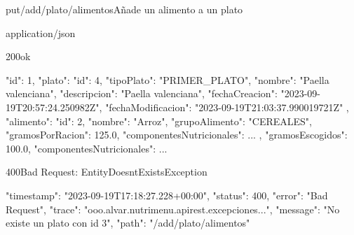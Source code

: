 \begin{apiRoute}{put}{/add/plato/alimentos}{Añade un alimento a un plato}
	\begin{routeParameter}
	\end{routeParameter}
	
	\begin{routeResponse}{application/json}
		\begin{routeResponseItem}{200}{ok}
			\begin{routeResponseItemBody}
{
    "id": 1,
    "plato": {
        "id": 4,
        "tipoPlato": "PRIMER_PLATO",
        "nombre": "Paella valenciana",
        "descripcion": "Paella valenciana",
        "fechaCreacion": "2023-09-19T20:57:24.250982Z",
        "fechaModificacion": "2023-09-19T21:03:37.990019721Z"
    },
    "alimento": {
        "id": 2,
        "nombre": "Arroz",
        "grupoAlimento": "CEREALES",
        "gramosPorRacion": 125.0,
        "componentesNutricionales": {...}
    },
    "gramosEscogidos": 100.0,
    "componentesNutricionales": {...}
}
			\end{routeResponseItemBody}
		\end{routeResponseItem}
		\begin{routeResponseItem}{400}{Bad Request: EntityDoesntExistsException}
			\begin{routeResponseItemBody}
{
    "timestamp": "2023-09-19T17:18:27.228+00:00",
    "status": 400,
    "error": "Bad Request",
    "trace": "ooo.alvar.nutrimenu.apirest.excepciones...",
    "message": "No existe un plato con id 3",
    "path": "/add/plato/alimentos"
}
			\end{routeResponseItemBody}
		\end{routeResponseItem}
	\end{routeResponse}
\end{apiRoute}

